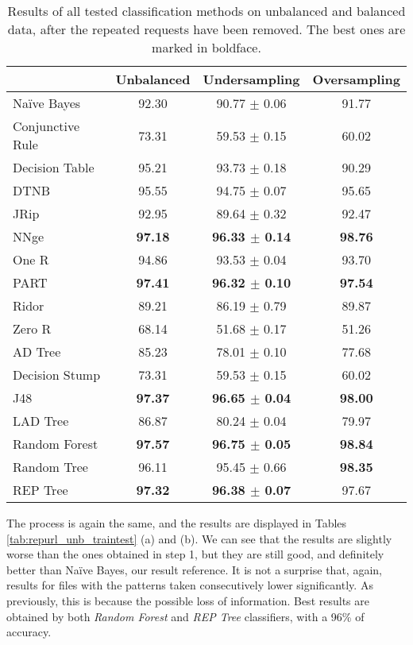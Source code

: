 \documentclass{llncs}
\begin{document}
\begin{table}[htpb]
\centering
{\small
\begin{tabular}{|l|c|c|c|}
\cline{2-4}
\multicolumn{1}{l|}{} & Unbalanced & Undersampling & Oversampling \\
\hline
Naïve Bayes & 92.30 & 90.77 $\pm$ 0.06 & 91.77 \\
\cline{1-1}
Conjunctive Rule & 73.31 & 59.53 $\pm$ 0.15 & 60.02 \\
\cline{1-1}
Decision Table & 95.21 & 93.73 $\pm$ 0.18 & 90.29 \\
\cline{1-1}
DTNB & 95.55 & 94.75 $\pm$ 0.07 & 95.65 \\
\cline{1-1}
JRip & 92.95 & 89.64 $\pm$ 0.32 & 92.47 \\
\cline{1-1}
NNge & \textbf{97.18} & \textbf{96.33 $\pm$ 0.14} & \textbf{98.76} \\
\cline{1-1}
One R & 94.86 & 93.53 $\pm$ 0.04 & 93.70 \\
\cline{1-1}
PART & \textbf{97.41} & \textbf{96.32 $\pm$ 0.10} & \textbf{97.54} \\
\cline{1-1}
Ridor & 89.21 & 86.19 $\pm$ 0.79 & 89.87 \\
\cline{1-1}
Zero R & 68.14 & 51.68 $\pm$ 0.17 & 51.26 \\
\cline{1-1}
AD Tree & 85.23 & 78.01 $\pm$ 0.10 & 77.68 \\
\cline{1-1}
Decision Stump & 73.31 & 59.53 $\pm$ 0.15 & 60.02 \\
\cline{1-1}
J48 & \textbf{97.37} & \textbf{96.65 $\pm$ 0.04} & \textbf{98.00} \\
\cline{1-1}
LAD Tree & 86.87 & 80.24 $\pm$ 0.04 & 79.97 \\
\cline{1-1}
Random Forest & \textbf{97.57} & \textbf{96.75 $\pm$ 0.05} & \textbf{98.84} \\
\cline{1-1}
Random Tree & 96.11 & 95.45 $\pm$ 0.66 & \textbf{98.35} \\
\cline{1-1}
REP Tree & \textbf{97.32} & \textbf{96.38 $\pm$ 0.07} & 97.67 \\
\hline
\end{tabular}
}
\caption[Global classification methods ranking after the removal of entries that could lead to missclassification.]{\label{tab:gobalrank_repurls} Results of all tested classification methods on unbalanced and balanced data, after the repeated requests have been removed. The best ones are marked in boldface.}
\end{table}

The process is again the same, and the results are displayed in Tables \ref{tab:repurl_unb_traintest} (a) and (b). We can see that the results are slightly worse than the ones obtained in step 1, but they are still good, and definitely better than Naïve Bayes, our result reference. It is not a surprise that, again, results for files with the patterns taken consecutively lower significantly. As previously, this is because the possible loss of information. Best results are obtained by both \textit{Random Forest} and \textit{REP Tree} classifiers, with a 96\% of accuracy.
\end{document}
